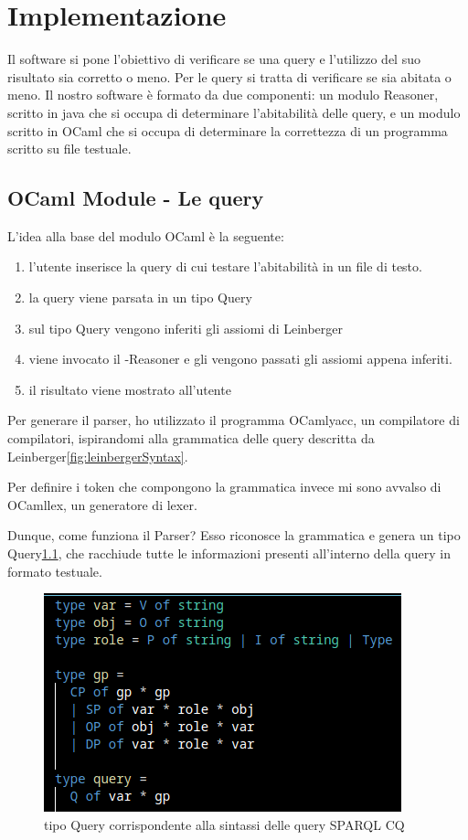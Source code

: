 \chapter[Implementazione]{Implementazione}
\label{chap:Implementazione}
Il software si pone l'obiettivo di verificare se una query e l'utilizzo del suo risultato sia corretto o meno. Per le query si tratta di verificare se sia abitata o meno. Il nostro software è formato da due componenti: un modulo Reasoner, scritto in java che si occupa di determinare l'abitabilità delle query, e un modulo scritto in OCaml che si occupa di determinare la correttezza di un programma scritto su file testuale.

\section{OCaml Module - Le query}
L'idea alla base del modulo OCaml è la seguente:
\begin{enumerate}
    \item l'utente inserisce la query di cui testare l'abitabilità in un file di testo.
    \item la query viene parsata in un tipo Query
    \item sul tipo Query vengono inferiti gli assiomi di Leinberger
    \item viene invocato il -Reasoner e gli vengono passati gli assiomi appena inferiti.
    \item il risultato viene mostrato all'utente
\end{enumerate}

Per generare il parser, ho utilizzato il programma OCamlyacc, un compilatore di compilatori, ispirandomi alla grammatica delle query descritta da Leinberger\ref{fig:leinbergerSyntax}. 

Per definire i token che compongono la grammatica invece mi sono avvalso di OCamllex, un generatore di lexer.


Dunque, come funziona il Parser? Esso riconosce la grammatica e genera un tipo Query\ref{fig:querType}, che racchiude tutte le informazioni presenti all'interno della query in formato testuale. 

\begin{figure}[H]
    \centering
    \includegraphics[scale=0.7]{pictures/queryType.png}
    \caption{tipo Query corrispondente alla sintassi delle query SPARQL CQ}
    \label{fig:querType}
\end{figure}


